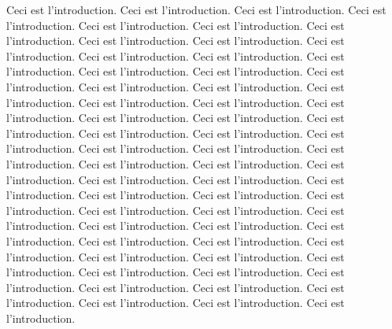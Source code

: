     Ceci est l'introduction.
    Ceci est l'introduction.
    Ceci est l'introduction.
    Ceci est l'introduction.
    Ceci est l'introduction.
    Ceci est l'introduction.
    Ceci est l'introduction.
    Ceci est l'introduction.
    Ceci est l'introduction.
    Ceci est l'introduction.
    Ceci est l'introduction.
    Ceci est l'introduction.
    Ceci est l'introduction.
    Ceci est l'introduction.
    Ceci est l'introduction.
    Ceci est l'introduction.
    Ceci est l'introduction.
    Ceci est l'introduction.
    Ceci est l'introduction.
    Ceci est l'introduction.
    Ceci est l'introduction.
    Ceci est l'introduction.
    Ceci est l'introduction.
    Ceci est l'introduction.
    Ceci est l'introduction.
    Ceci est l'introduction.
    Ceci est l'introduction.
    Ceci est l'introduction.
    Ceci est l'introduction.
    Ceci est l'introduction.
    Ceci est l'introduction.
    Ceci est l'introduction.
    Ceci est l'introduction.
    Ceci est l'introduction.
    Ceci est l'introduction.
    Ceci est l'introduction.
    Ceci est l'introduction.
    Ceci est l'introduction.
    Ceci est l'introduction.
    Ceci est l'introduction.
    Ceci est l'introduction.
    Ceci est l'introduction.
    Ceci est l'introduction.
    Ceci est l'introduction.
    Ceci est l'introduction.
    Ceci est l'introduction.
    Ceci est l'introduction.
    Ceci est l'introduction.
    Ceci est l'introduction.
    Ceci est l'introduction.
    Ceci est l'introduction.
    Ceci est l'introduction.
    Ceci est l'introduction.
    Ceci est l'introduction.
    Ceci est l'introduction.
    Ceci est l'introduction.
    Ceci est l'introduction.
    Ceci est l'introduction.
    Ceci est l'introduction.
    Ceci est l'introduction.
    Ceci est l'introduction.
